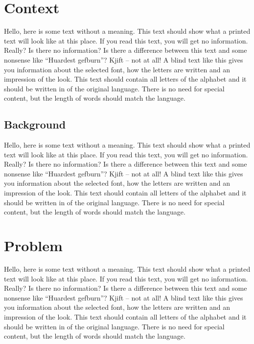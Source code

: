 \documentclass[%
  english,%
  todotools=true,%
  trtype=singlearticle%
]{hpitr}
\begin{document}
\section{Context}
\label{sec:context}

Hello, here is some text without a meaning. This text should show
what a printed text will look like at this place. If you read this
text, you will get no information. Really? Is there no information?
Is there a difference between this text and some nonsense like
“Huardest gefburn”? Kjift – not at all! A blind text like this gives
you information about the selected font, how the letters are written
and an impression of the look. This text should contain all letters
of the alphabet and it should be written in of the original
language. There is no need for special content, but the length of
words should match the language.


\subsection{Background}
\label{sec:background}

Hello, here is some text without a meaning. This text should show
what a printed text will look like at this place. If you read this
text, you will get no information. Really? Is there no information?
Is there a difference between this text and some nonsense like
“Huardest gefburn”? Kjift – not at all! A blind text like this gives
you information about the selected font, how the letters are written
and an impression of the look. This text should contain all letters
of the alphabet and it should be written in of the original
language. There is no need for special content, but the length of
words should match the language.

\section{Problem}
\label{sec:problem}

Hello, here is some text without a meaning. This text should show
what a printed text will look like at this place. If you read this
text, you will get no information. Really? Is there no information?
Is there a difference between this text and some nonsense like
“Huardest gefburn”? Kjift – not at all! A blind text like this gives
you information about the selected font, how the letters are written
and an impression of the look. This text should contain all letters
of the alphabet and it should be written in of the original
language. There is no need for special content, but the length of
words should match the language.~\cite{953350}
\end{document}

